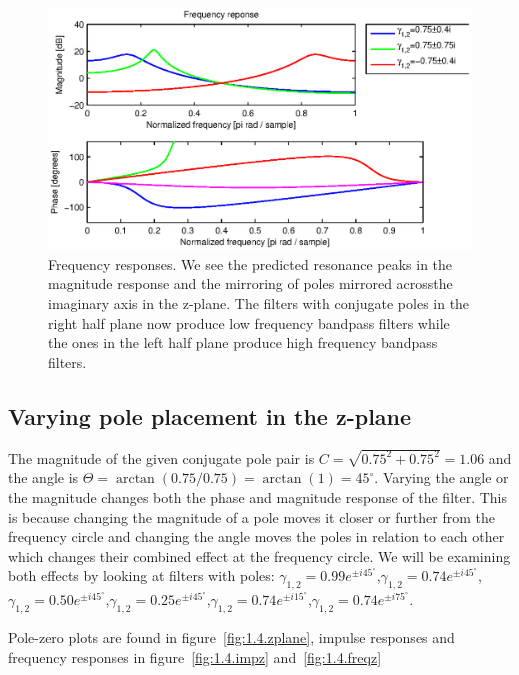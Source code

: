 \begin{figure}
	\center
	\includegraphics{./picture/ha6_1_3_freqz.eps}
	\caption{Frequency responses. We see the predicted resonance peaks in the magnitude response and the mirroring of poles mirrored acrossthe imaginary axis in the z-plane. The filters with conjugate poles in the right half plane now produce low frequency bandpass filters while the ones in the left half plane produce high frequency bandpass filters.}
	\label{fig:1.3.freqz}
\end{figure}

\subsection{Varying pole placement in the z-plane}
The magnitude of the given conjugate pole pair is \(C=\sqrt{0.75^2+0.75^2}=1.06\) and the angle is \(\Theta = \arctan(0.75/0.75) = \arctan(1) = 45^\circ\). Varying the angle or the magnitude changes both the phase and magnitude response of the filter.
This is because changing the magnitude of a pole moves it closer or further from the frequency circle and changing the angle moves the poles in relation to each other which changes their combined effect at the frequency circle. We will be examining both effects by looking
at filters with poles: \(\gamma_{1,2}=0.99e^{\pm i45^\circ}\),\(\gamma_{1,2}=0.74e^{\pm i45^\circ}\),\(\gamma_{1,2}=0.50e^{\pm i45^\circ}\),\(\gamma_{1,2}=0.25e^{\pm i45^\circ}\),\(\gamma_{1,2}=0.74e^{\pm i15^\circ}\),\(\gamma_{1,2}=0.74e^{\pm i75^\circ}\).

Pole-zero plots are found in figure~\ref{fig:1.4.zplane}, impulse responses and frequency responses in figure~\ref{fig:1.4.impz} and~\ref{fig:1.4.freqz}

